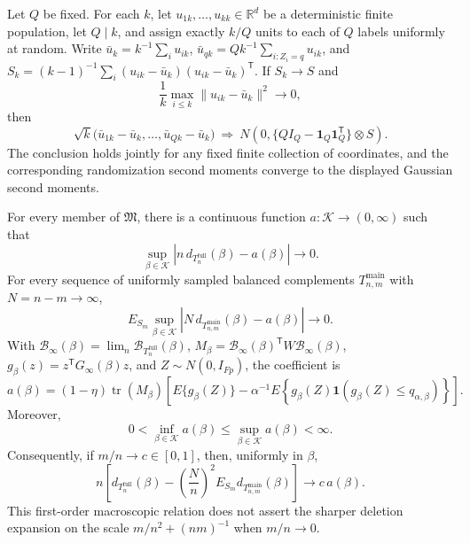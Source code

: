 Let \(Q\) be fixed.  For each \(k\), let \(u_{1k},\ldots,u_{kk}\in\mathbb R^d\) be a deterministic finite population, let \(Q\mid k\), and assign exactly \(k/Q\) units to each of \(Q\) labels uniformly at random.  Write \(\bar u_k=k^{-1}\sum_i u_{ik}\), \(\bar u_{qk}=Qk^{-1}\sum_{i:Z_i=q}u_{ik}\), and \(S_k=(k-1)^{-1}\sum_i(u_{ik}-\bar u_k)(u_{ik}-\bar u_k)^{\mathsf T}\).  If \(S_k\to S\) and
\[
\frac{1}{k}\max_{i\leq k}\lVert u_{ik}-\bar u_k\rVert^2\longrightarrow0,
\]
then
\[
\sqrt{k}\bigl(\bar u_{1k}-\bar u_k,\ldots,\bar u_{Qk}-\bar u_k\bigr)
\ \Rightarrow\
N\!\left(0,\{QI_Q-\mathbf 1_Q\mathbf 1_Q^{\mathsf T}\}\otimes S\right).
\]
The conclusion holds jointly for any fixed finite collection of coordinates, and the corresponding randomization second moments converge to the displayed Gaussian second moments.

For every member of \(\mathfrak M\), there is a continuous function \(a:\mathcal K\to(0,\infty)\) such that
\[
\sup_{\beta\in\mathcal K}
\left|n\,d_{T_n^{\mathrm{full}}}(\beta)-a(\beta)\right|\longrightarrow0.
\]
For every sequence of uniformly sampled balanced complements \(T_{n,m}^{\mathrm{main}}\) with \(N=n-m\to\infty\),
\[
E_{S_m}\sup_{\beta\in\mathcal K}
\left|N\,d_{T_{n,m}^{\mathrm{main}}}(\beta)-a(\beta)\right|\longrightarrow0.
\]
With \(\mathcal B_\infty(\beta)=\lim_n\mathcal B_{T_n^{\mathrm{full}}}(\beta)\), \(M_\beta=\mathcal B_\infty(\beta)^{\mathsf T}W\mathcal B_\infty(\beta)\), \(g_\beta(z)=z^{\mathsf T}G_\infty(\beta)z\), and \(Z\sim N(0,I_{Fp})\), the coefficient is
\[
a(\beta)
=(1-\eta)\operatorname{tr}(M_\beta)
\left[
E\{g_\beta(Z)\}
-\alpha^{-1}E\!\left\{g_\beta(Z)
\mathbf 1\!\left(g_\beta(Z)\leq q_{\alpha,\beta}\right)\right\}
\right].
\]
Moreover,
\[
0<\inf_{\beta\in\mathcal K}a(\beta)
\leq\sup_{\beta\in\mathcal K}a(\beta)<\infty.
\]
Consequently, if \(m/n\to c\in[0,1]\), then, uniformly in \(\beta\),
\[
n\left[
d_{T_n^{\mathrm{full}}}(\beta)
-\left(\frac{N}{n}\right)^2
E_{S_m}d_{T_{n,m}^{\mathrm{main}}}(\beta)
\right]\longrightarrow c\,a(\beta).
\]
This first-order macroscopic relation does not assert the sharper deletion expansion on the scale \(m/n^2+(nm)^{-1}\) when \(m/n\to0\).

